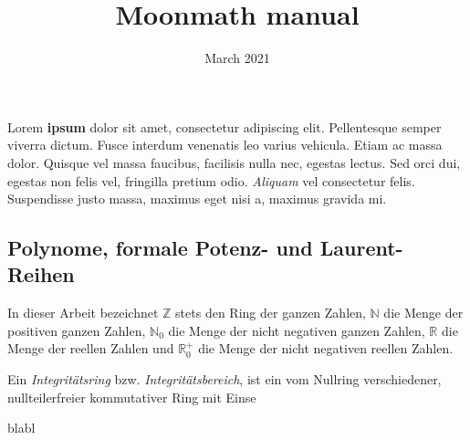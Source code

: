 \documentclass{article}
\title{Moonmath manual}
\author{}
\date{March 2021}
\begin{document}
\maketitle

Lorem \textbf{ipsum} dolor sit amet, consectetur adipiscing elit. Pellentesque semper viverra dictum.  Fusce interdum venenatis leo varius vehicula. Etiam ac massa dolor. Quisque vel massa faucibus, facilisis nulla nec, egestas lectus. Sed orci dui, egestas non felis vel, fringilla pretium odio. \textit{Aliquam} vel consectetur felis. Suspendisse justo massa, maximus eget nisi a, maximus gravida mi.




\subsection{Polynome, formale Potenz- und Laurent-Reihen}
In dieser Arbeit bezeichnet $\mathbb{Z}$ stets den Ring der ganzen Zahlen, $\mathbb{N}$ die Menge der positiven ganzen Zahlen,
$\mathbb{N}_0$ die Menge der nicht negativen ganzen Zahlen,
$\mathbb{R}$ die Menge der reellen Zahlen und $\mathbb{R}^+_0$ die Menge
der nicht negativen reellen Zahlen.

Ein \textit{Integritätsring} bzw. \textit{Integritätsbereich}, ist ein vom Nullring verschiedener, nullteilerfreier kommutativer Ring mit Einse

blabl
\end{document}
